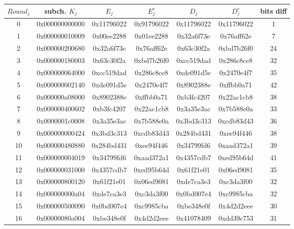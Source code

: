 \documentclass[12pt,letterpaper]{article}
\begin{document}
\begin{center}
\begin{tabular}{||c|c|c|c|c|c|c||} 
 \hline
    $Round_j$ & subch. $K_j$ & $E_j$ & $E_j^c$ & $D_j$ & $D_j^c$ & bits diff \\ 
 \hline
    0 & 0x000000000000 & 0x11796022 & 0x91796022 & 0x11796022 & 0x11796022 & 1\\
 \hline
    1 & 0x000000010009 & 0x00ee2288 & 0x01ee2288 & 0x32a6f73e & 0x76aff62e & 7\\
 \hline
    2 & 0x000000200680 & 0x32a6f73e & 0x76aff62e & 0x63c30f2a & 0xbd7b26f0 & 24\\
 \hline
    3 & 0x000000180003 & 0x63c30f2a & 0xbd7b26f0 & 0xcc519dad & 0x286c8ce8 & 32\\
 \hline
    4 & 0x000000064000 & 0xcc519dad & 0x286c8ce8 & 0xde091d5e & 0x2470e4f7 & 35\\
 \hline
    5 & 0x000000002140 & 0xde091d5e & 0x2470e4f7 & 0x8902388e & 0xffbb0a71 & 42\\
 \hline
    6 & 0x000000a08000 & 0x8902388e & 0xffbb0a71 & 0xb3fc4207 & 0x22ac1cb8 & 38\\
 \hline
    7 & 0x000000400602 & 0xb3fc4207 & 0x22ac1cb8 & 0x3a35e3ac & 0x7b588e0a & 33\\
 \hline
    8 & 0x0000001c0008 & 0x3a35e3ac & 0x7b588e0a & 0x3bd3c313 & 0xcdb83d43 & 36\\
 \hline
    9 & 0x000000000424 & 0x3bd3c313 & 0xcdb83d43 & 0x284bd431 & 0xee94f446 & 38\\
 \hline
    10 & 0x000000480880 & 0x284bd431 & 0xee94f446 & 0x34799fd6 & 0xaad372a1 & 39\\
 \hline
    11 & 0x000000004019 & 0x34799fd6 & 0xaad372a1 & 0x4357cdb7 & 0xed95b64d & 41\\
 \hline
    12 & 0x000000031000 & 0x4357cdb7 & 0xed95b64d & 0x61f21e01 & 0x06ed9081 & 35\\
 \hline
    13 & 0x000000800120 & 0x61f21e01 & 0x06ed9081 & 0xde7ca3e3 & 0xc3da3f00 & 32\\
 \hline
    14 & 0x000000000a04 & 0xde7ca3e3 & 0xc3da3f00 & 0x0bd007e4 & 0xc9985cba & 32\\
 \hline
    15 & 0x000000500090 & 0x0bd007e4 & 0xc9985cba & 0xbe348e0f & 0x4d2d2eee & 30\\
 \hline
    16 & 0x00000080a004 & 0xbe348e0f & 0x4d2d2eee & 0x41078409 & 0xdd39c753 & 31\\
 \hline
\end{tabular}
\end{center}
\end{document}
